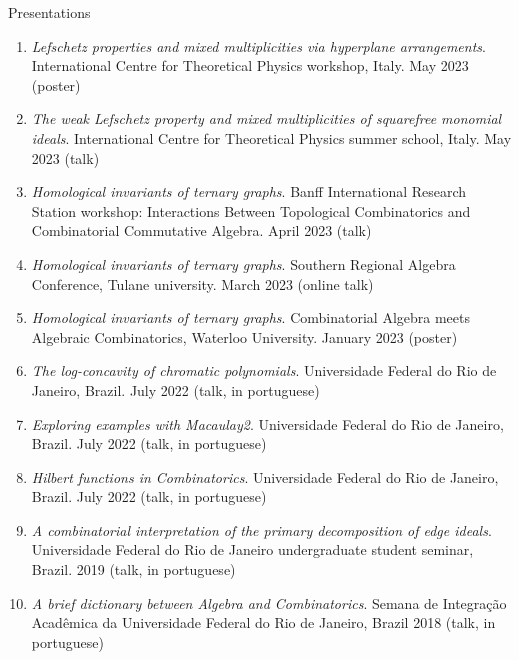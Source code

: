 \documentclass[12pt]{resume} %
\begin{document}
\begin{rSection}{Presentations}
\begin{enumerate}
        \item \textit{Lefschetz properties and mixed multiplicities via hyperplane arrangements}. International Centre for Theoretical Physics workshop, Italy. May 2023 (poster)
        \item \textit{The weak Lefschetz property and mixed multiplicities of squarefree monomial ideals}. International Centre for Theoretical Physics summer school, Italy. May 2023 (talk)
        \item \textit{Homological invariants of ternary graphs}. Banff International Research Station workshop: Interactions Between Topological Combinatorics and Combinatorial Commutative Algebra. April 2023 (talk)
        \item \textit{Homological invariants of ternary graphs}. Southern Regional Algebra Conference, Tulane university. March 2023 (online talk)
        \item \textit{Homological invariants of ternary graphs}. Combinatorial Algebra meets Algebraic Combinatorics, Waterloo University. January 2023 (poster)
        \item \textit{The log-concavity of chromatic polynomials}. Universidade Federal do Rio de Janeiro, Brazil. July 2022 (talk, in portuguese)
        \item \textit{Exploring examples with Macaulay2}. Universidade Federal do Rio de Janeiro, Brazil. July 2022 (talk, in portuguese)
        \item \textit{Hilbert functions in Combinatorics}. Universidade Federal do Rio de Janeiro, Brazil. July 2022 (talk, in portuguese)
        \item \textit{A combinatorial interpretation of the primary decomposition of edge ideals}. Universidade Federal do Rio de Janeiro undergraduate student seminar, Brazil. 2019 (talk, in portuguese)
        \item \textit{A brief dictionary between Algebra and Combinatorics}. Semana de Integração Acadêmica da Universidade Federal do Rio de Janeiro, Brazil 2018 (talk, in portuguese)
    \end{enumerate}
\end{rSection}
\end{document}
